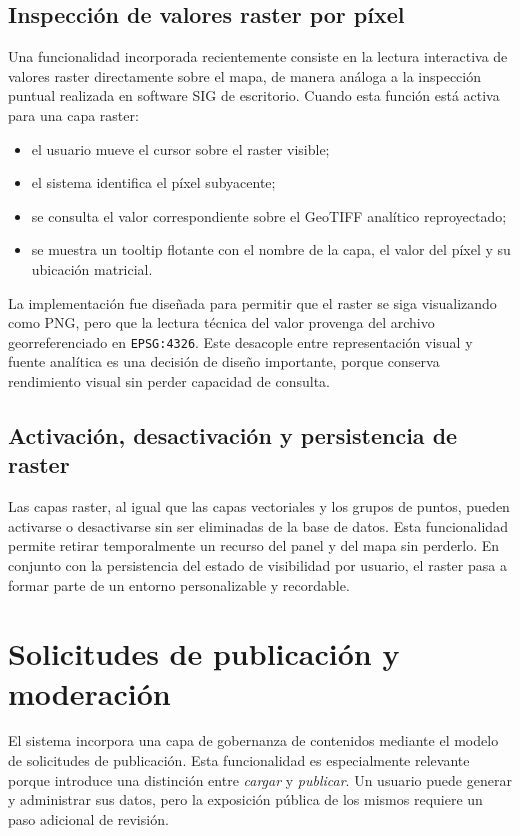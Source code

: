 \documentclass[12pt,a4paper]{report}
\begin{document}
\subsection{Inspecci\'on de valores raster por p\'ixel}

Una funcionalidad incorporada recientemente consiste en la lectura interactiva de valores raster directamente sobre el mapa, de manera an\'aloga a la inspecci\'on puntual realizada en software SIG de escritorio. Cuando esta funci\'on est\'a activa para una capa raster:

\begin{itemize}
    \item el usuario mueve el cursor sobre el raster visible;
    \item el sistema identifica el p\'ixel subyacente;
    \item se consulta el valor correspondiente sobre el GeoTIFF anal\'itico reproyectado;
    \item se muestra un tooltip flotante con el nombre de la capa, el valor del p\'ixel y su ubicaci\'on matricial.
\end{itemize}

La implementaci\'on fue dise\~nada para permitir que el raster se siga visualizando como PNG, pero que la lectura t\'ecnica del valor provenga del archivo georreferenciado en \texttt{EPSG:4326}. Este desacople entre representaci\'on visual y fuente anal\'itica es una decisi\'on de dise\~no importante, porque conserva rendimiento visual sin perder capacidad de consulta.

\subsection{Activaci\'on, desactivaci\'on y persistencia de raster}

Las capas raster, al igual que las capas vectoriales y los grupos de puntos, pueden activarse o desactivarse sin ser eliminadas de la base de datos. Esta funcionalidad permite retirar temporalmente un recurso del panel y del mapa sin perderlo. En conjunto con la persistencia del estado de visibilidad por usuario, el raster pasa a formar parte de un entorno personalizable y recordable.

\section{Solicitudes de publicaci\'on y moderaci\'on}

El sistema incorpora una capa de gobernanza de contenidos mediante el modelo de solicitudes de publicaci\'on. Esta funcionalidad es especialmente relevante porque introduce una distinci\'on entre \emph{cargar} y \emph{publicar}. Un usuario puede generar y administrar sus datos, pero la exposici\'on p\'ublica de los mismos requiere un paso adicional de revisi\'on.
\end{document}
